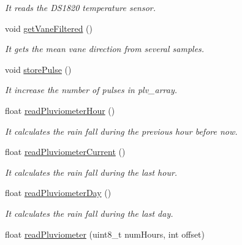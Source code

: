 \begin{DoxyCompactItemize}
\begin{DoxyCompactList}\small\item\em It reads the D\+S1820 temperature sensor. \end{DoxyCompactList}\item 
void \hyperlink{class_wasp_sensor_agr__v20_a9b81bad6805c3b4f7fd46133ef538275}{get\+Vane\+Filtered} ()
\begin{DoxyCompactList}\small\item\em It gets the mean vane direction from several samples. \end{DoxyCompactList}\item 
void \hyperlink{class_wasp_sensor_agr__v20_a7191176eecade3e36bb421e5ab8d976b}{store\+Pulse} ()
\begin{DoxyCompactList}\small\item\em It increase the number of pulses in \textquotesingle{}plv\+\_\+array\textquotesingle{}. \end{DoxyCompactList}\item 
float \hyperlink{class_wasp_sensor_agr__v20_a099855e00df0ff84c0cb5590bcbf3f54}{read\+Pluviometer\+Hour} ()
\begin{DoxyCompactList}\small\item\em It calculates the rain fall during the previous hour before now. \end{DoxyCompactList}\item 
float \hyperlink{class_wasp_sensor_agr__v20_a417f158b0f8ee2dc3060788f48fa2510}{read\+Pluviometer\+Current} ()
\begin{DoxyCompactList}\small\item\em It calculates the rain fall during the last hour. \end{DoxyCompactList}\item 
float \hyperlink{class_wasp_sensor_agr__v20_ad701f10ecb49bf16273052f388a60c45}{read\+Pluviometer\+Day} ()
\begin{DoxyCompactList}\small\item\em It calculates the rain fall during the last day. \end{DoxyCompactList}\item 
float \hyperlink{class_wasp_sensor_agr__v20_a1746c6ffb2f0ce498cc13a1bf8b43d53}{read\+Pluviometer} (uint8\+\_\+t num\+Hours, int offset)
\end{DoxyCompactItemize}
